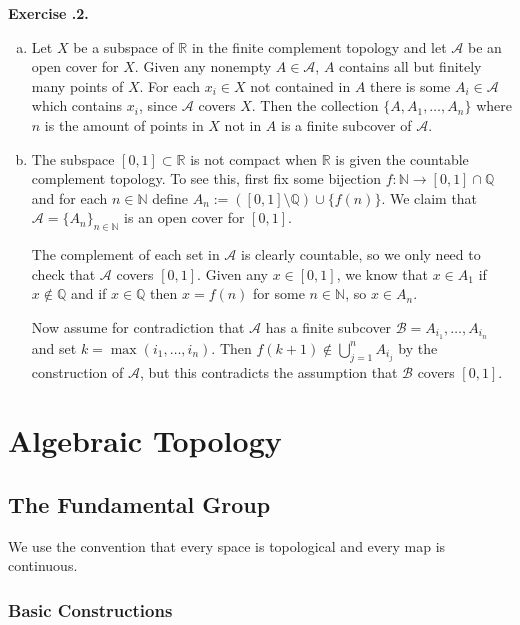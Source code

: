 \documentclass{report}
\theoremstyle{definition}
\theoremstyle{remark}
\newenvironment{exc}[1]{\noindent\textbf{Exercise \thesection.#1.}}{\medskip}
\newcommand{\N}{\mathbb{N}}
\newcommand{\Q}{\mathbb{Q}}
\newcommand{\R}{\mathbb{R}}
\newcommand{\set}[1]{\{#1\}}
\newcommand{\prt}[1]{\mathcal{#1}}
\let\oldmax\max
\renewcommand{\max}[1]{\oldmax \left( #1 \right)}
\begin{document}
\begin{exc}{2}
    \begin{enumerate}[(a)]
        \item Let $X$ be a subspace of $\R$ in the finite complement topology and let $\prt{A}$ be an open cover for $X$. Given any nonempty $A \in \prt{A}$, $A$ contains all but finitely many points of $X$. For each $x_i \in X$ not contained in $A$ there is some $A_i \in \prt{A}$ which contains $x_i$, since $\prt{A}$ covers $X$. Then the collection $\set{A, A_1, \dots, A_n}$ where $n$ is the amount of points in $X$ not in $A$ is a finite subcover of $\prt{A}$.
        
        \item The subspace $[0, 1] \subset \R$ is not compact when $\R$ is given the countable complement topology. To see this, first fix some bijection $f : \N \to [0, 1] \cap \Q$ and for each $n \in \N$ define $A_n := ([0, 1] \setminus{\Q}) \cup \set{f(n)}$. We claim that $\prt{A} = \set{A_n}_{n \in \N}$ is an open cover for $[0, 1]$.
        
        The complement of each set in $\prt{A}$ is clearly countable, so we only need to check that $\prt{A}$ covers $[0, 1]$. Given any $x \in [0, 1]$, we know that $x \in A_1$ if $x \notin \Q$ and if $x \in \Q$ then $x = f(n)$ for some $n \in \N$, so $x \in A_n$.
        
        Now assume for contradiction that $\prt{A}$ has a finite subcover $\prt{B} = {A_{i_1}, \dots, A_{i_n}}$ and set $k = \max{i_1, \dots, i_n}$. Then $f(k+1) \notin \bigcup_{j=1}^n A_{i_j}$ by the construction of $\prt{A}$, but this contradicts the assumption that $\prt{B}$ covers $[0, 1]$. 
        
    \end{enumerate}
\end{exc}

\part{Algebraic Topology}

\chapter{The Fundamental Group}

We use the convention that every space is topological and every map is continuous.

\section{Basic Constructions}
\end{document}
